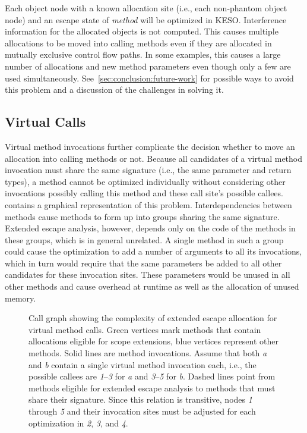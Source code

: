 			Each object node with a known allocation site (i.e., each non-phantom object node) and an escape state of
			\emph{method} will be optimized in KESO\@. Interference information for the allocated objects is not computed.
			This causes multiple allocations to be moved into calling methods even if they are allocated in mutually exclusive
			control flow paths. In some examples, this causes a large number of allocations and new method parameters even
			though only a few are used simultaneously. See~\cref{sec:conclusion:future-work} for possible ways to avoid this
			problem and a discussion of the challenges in solving it.

		\subsection{Virtual Calls}
			\label{sub:eea:analysis:virtual}
			Virtual method invocations further complicate the decision whether to move an allocation into calling methods or
			not. Because all candidates of a virtual method invocation must share the same signature (i.e., the same parameter
			and return types), a method cannot be optimized individually without considering other invocations possibly
			calling this method and these call site's possible callees.  contains a graphical
			representation of this problem. Interdependencies between methods cause methods to form up into groups sharing the
			same signature. Extended escape analysis, however, depends only on the code of the methods in these groups, which
			is in general unrelated. A single method in such a group could cause the optimization to add a number of arguments
			to all its invocations, which in turn would require that the same parameters be added to all other candidates for
			these invocation sites. These parameters would be unused in all other methods and cause overhead at runtime as
			well as the allocation of unused memory.

			\begin{figure}
				\centering%

				\caption[Call graph showing the complexity of extended escape allocation for virtual method calls]{%
					Call graph showing the complexity of extended escape allocation for virtual method calls. Green
					{\color{cggreen}\blacksquare} vertices mark methods that contain allocations eligible for scope extensions,
					blue {\color{cgblue}\blacksquare} vertices represent other methods. Solid lines are method invocations. Assume
					that both \emph{a} and \emph{b} contain a single virtual method invocation each, i.e., the possible callees
					are \emph{1}–\emph{3} for \emph{a} and \emph{3}–\emph{5} for \emph{b}. Dashed lines point from methods
					eligible for extended escape analysis to methods that must share their signature. Since this relation is
					transitive, nodes \emph{1} through \emph{5} and their invocation sites must be adjusted for each optimization
					in \emph{2}, \emph{3}, and \emph{4}.}%
				\label{fig:eea:analysis:virtual}%
			\end{figure}

